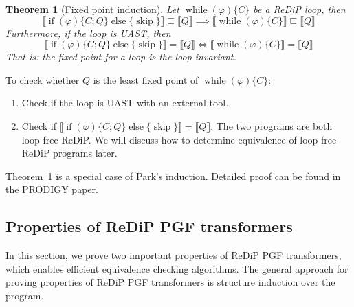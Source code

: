 \documentclass[a4paper]{article}
\renewcommand{\S}[1]{ \llbracket #1 \rrbracket }
\newtheorem{theorem}{Theorem}[section]
\begin{document}
\begin{theorem}[Fixed point induction]\label{thm:lfp-ind}
	Let \(\operatorname{while}(\varphi)\{C\}\) be a ReDiP loop, then
	\[
		\S{\operatorname{if}(\varphi)\{C;Q\}\operatorname{else}\{\operatorname{skip}\}} \sqsubseteq \S{Q}
		\implies
		\S{\operatorname{while}(\varphi)\{C\}} \sqsubseteq \S{Q}
	\]
	Furthermore, if the loop is UAST, then
	\[
		\S{\operatorname{if}(\varphi)\{C;Q\}\operatorname{else}\{\operatorname{skip}\}} = \S{Q}
		\iff
		\S{\operatorname{while}(\varphi)\{C\}} = \S{Q}
	\]
	That is: the fixed point for a loop is the loop invariant.
\end{theorem}
To check whether \(Q\) is the least fixed point of \(\operatorname{while}(\varphi)\{C\}\):
\begin{enumerate}
	\item Check if the loop is UAST with an external tool.
	\item Check if \(\S{\operatorname{if}(\varphi)\{C;Q\}\operatorname{else}\{\operatorname{skip}\}} = \S{Q}\).
	      The two programs are both loop-free ReDiP.
	      We will discuss how to determine equivalence of loop-free ReDiP programs later.
\end{enumerate}
Theorem~\ref{thm:lfp-ind} is a special case of Park's induction. Detailed proof can be found in the PRODIGY paper\cite{cav-extended}.

\subsection{Properties of ReDiP PGF transformers}

In this section, we prove two important properties of ReDiP PGF transformers, which enables efficient equivalence checking algorithms.
The general approach for proving properties of ReDiP PGF transformers is structure induction over the program.
\end{document}
